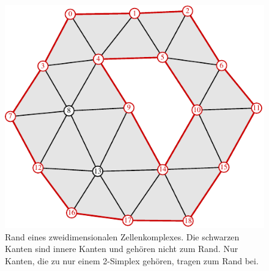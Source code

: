%
%
%
\begin{figure}
\centering
\includegraphics{chapters/120-topologie/images/rand.pdf}
\caption{Rand eines zweidimensionalen Zellenkomplexes.
Die schwarzen Kanten sind innere Kanten und gehören nicht zum Rand.
Nur Kanten, die zu nur einem 2-Simplex gehören, tragen zum Rand bei.
\label{buch:topologie:homologie:fig:rand}}
\end{figure}
